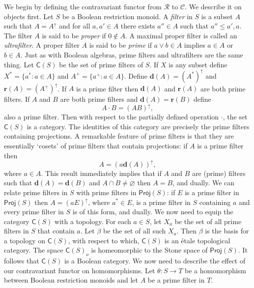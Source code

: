 \documentclass[a4paper]{amsart}
\begin{document}
We begin by defining the contravariant functor from  $\mathscr{R}$ to $\mathscr{C}$.
We describe it on objects first.
Let $S$ be a Boolean restriction monoid.
A {\em filter} in $S$ is a subset $A$ such that $A = A^{\uparrow}$ and for all $a,a' \in A$ there exists $a'' \in A$
such that $a'' \leq a',a$.
The filter $A$ is said to be {\em proper} if $0 \notin A$.
A maximal proper filter is called an {\em ultrafilter}.
A proper filter $A$ is said to be {\em prime} if $a \vee b \in A$ implies $a \in A$ or $b \in A$.
Just as with Boolean algebras, prime filters and ultrafilters are the same thing.
Let $\mathsf{C}(S)$ be the set of prime filters of $S$.
If $X$ is any subset define $X^{\ast} = \{a^{\ast} \colon a \in A\}$ and $A^{+} = \{a^{+} \colon a \in A\}$.
Define $\mathbf{d}(A) = (A^{\ast})^{\uparrow}$ and $\mathbf{r}(A) = (A^{+})^{\uparrow}$.
If $A$ is a prime filter then $\mathbf{d}(A)$ and $\mathbf{r}(A)$ 
are both prime filters.
If $A$ and $B$ are both prime filters and $\mathbf{d}(A) = \mathbf{r}(B)$ 
define
$$A \cdot B = (AB)^{\uparrow},$$ 
also a prime filter.
Then with respect to the partially defined operation $\cdot$, the set $\mathsf{C}(S)$ is a category.
The identities of this category are precisely the prime filters containing projections.
A remarkable feature of prime filters is that they are essentially `cosets' of prime filters that contain projections:
if $A$ is a prime filter then 
$$A = (a\mathbf{d}(A))^{\uparrow},$$ 
where $a \in A$.
This result immediately implies that if $A$ and $B$ are (prime) filters such that $\mathbf{d}(A) = \mathbf{d}(B)$
and $A \cap B \neq \varnothing$ then $A = B$, and dually.
We can relate prime filters in $S$ with prime filters in $\mathsf{Proj}(S)$:
if $E$ is a prime filter in $\mathsf{Proj}(S)$ then $A = (aE)^{\uparrow}$, where $a^{\ast} \in E$, is a prime filter in $S$ containing $a$
and every prime filter in $S$ is of this form, and dually.
We now need to equip the category $\mathsf{C}(S)$ with a topology.
For each $a \in S$, let $X_{a}$ be the set of all prime filters in $S$ that contain $a$.
Let $\beta$ be the set of all such $X_{a}$.
Then $\beta$ is the basis for a topology on $\mathsf{C}(S)$,
with respect to which, $\mathsf{C}(S)$ is an \'etale topological category.
The space $\mathsf{C}(S)_{o}$ is homeomorphic to the Stone space of $\mathsf{Proj}(S)$.
It follows that $\mathsf{C}(S)$ is a Boolean category.
We now need to describe the effect of our contravariant functor on homomorphisms.
Let $\theta \colon S \rightarrow T$ be a homomorphism between Boolean restriction monoids
and let $A$ be a prime filter in $T$.
\end{document}
